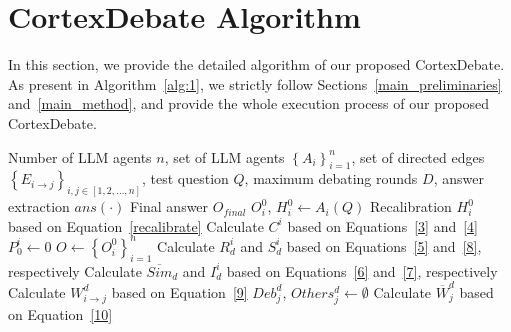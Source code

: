\section{CortexDebate Algorithm}
\label{appendix_cortexdebate_algorithm}

In this section, we provide the detailed algorithm of our proposed CortexDebate. As present in Algorithm~\ref{alg:1}, we strictly follow Sections~\ref{main_preliminaries} and~\ref{main_method}, and provide the whole execution process of our proposed CortexDebate.

\begin{algorithm*}
\small
	\renewcommand{\algorithmicrequire}{\textbf{Input:}}
	\renewcommand{\algorithmicensure}{\textbf{Output:}}
	\caption{CortexDebate Method}
	\label{alg:1}
	\begin{algorithmic}[1]
		\REQUIRE Number of LLM agents $n$, set of LLM agents $\left \{A_{i} \right \}_{i=1}^{n}$, set of directed edges $\left \{E_{i\to j} \right \}_{i,j\in \left [1,2,...,n  \right ] }$, test question $Q$, maximum debating rounds $D$, answer extraction $ans\left ( \cdot  \right ) $
		\ENSURE Final answer $O_{final}$
                \STATE $O_{i}^{0}$, $H_{i}^{0} \gets A_{i}\left (Q  \right )$  \textcolor{blue}{}
                \STATE Recalibration $H_{i}^{0}$ based on Equation~\eqref{recalibrate}
                \STATE Calculate $C^{i}$ based on Equations~\eqref{3} and~\eqref{4}
                \STATE $P_{0}^{i}\gets 0$
            \ENDFOR
            \STATE $O \gets \left \{ O_{i}^{0} \right \}_{i=1}^{n} $  \textcolor{blue}{}
                    \STATE Calculate $R_{d}^{i}$ and $S_{d}^{i}$ based on Equations~\eqref{5} and~\eqref{8}, respectively
                            \STATE Calculate $\overline{{Sim}}_{d}$ and $I_{d}^{i}$ based on Equations~\eqref{6} and~\eqref{7}, respectively  
                            \STATE Calculate $W_{i\to j}^{d}$ based on Equation~\eqref{9}   \textcolor{blue}{}
                        \ENDIF
                    \ENDFOR
                \ENDFOR
                    \STATE $Deb_{j}^{d}$, $Others_{j}^{d}\gets \emptyset$    \textcolor{blue}{}
                    \STATE Calculate $\overline{{W}}_{j}^{d}$ based on Equation~\eqref{10}

\end{algorithmic}
\end{algorithm*}
